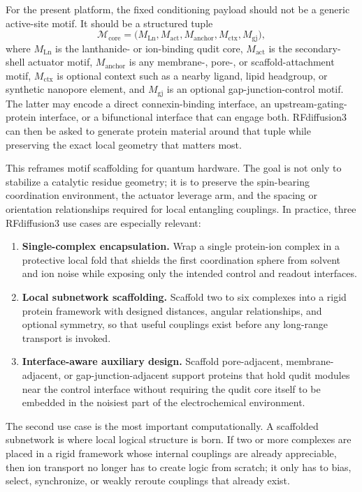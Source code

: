 \documentclass[11pt]{report}
\theoremstyle{definition}
\begin{document}
For the present platform, the fixed conditioning payload should not be a generic active-site motif. It should be a structured tuple
\[
\mathcal{M}_{\mathrm{core}}=
\big(
M_{\mathrm{Ln}},
M_{\mathrm{act}},
M_{\mathrm{anchor}},
M_{\mathrm{ctx}},
M_{\mathrm{gj}}
\big),
\]
where $M_{\mathrm{Ln}}$ is the lanthanide- or ion-binding qudit core, $M_{\mathrm{act}}$ is the secondary-shell actuator motif, $M_{\mathrm{anchor}}$ is any membrane-, pore-, or scaffold-attachment motif, $M_{\mathrm{ctx}}$ is optional context such as a nearby ligand, lipid headgroup, or synthetic nanopore element, and $M_{\mathrm{gj}}$ is an optional gap-junction-control motif. The latter may encode a direct connexin-binding interface, an upstream-gating-protein interface, or a bifunctional interface that can engage both. RFdiffusion3 can then be asked to generate protein material around that tuple while preserving the exact local geometry that matters most.

This reframes motif scaffolding for quantum hardware. The goal is not only to stabilize a catalytic residue geometry; it is to preserve the spin-bearing coordination environment, the actuator leverage arm, and the spacing or orientation relationships required for local entangling couplings. In practice, three RFdiffusion3 use cases are especially relevant:

\begin{enumerate}[leftmargin=2em]
\item \textbf{Single-complex encapsulation.} Wrap a single protein-ion complex in a protective local fold that shields the first coordination sphere from solvent and ion noise while exposing only the intended control and readout interfaces.
\item \textbf{Local subnetwork scaffolding.} Scaffold two to six complexes into a rigid protein framework with designed distances, angular relationships, and optional symmetry, so that useful couplings exist before any long-range transport is invoked.
\item \textbf{Interface-aware auxiliary design.} Scaffold pore-adjacent, membrane-adjacent, or gap-junction-adjacent support proteins that hold qudit modules near the control interface without requiring the qudit core itself to be embedded in the noisiest part of the electrochemical environment.
\end{enumerate}

The second use case is the most important computationally. A scaffolded subnetwork is where local logical structure is born. If two or more complexes are placed in a rigid framework whose internal couplings are already appreciable, then ion transport no longer has to create logic from scratch; it only has to bias, select, synchronize, or weakly reroute couplings that already exist.
\end{document}
